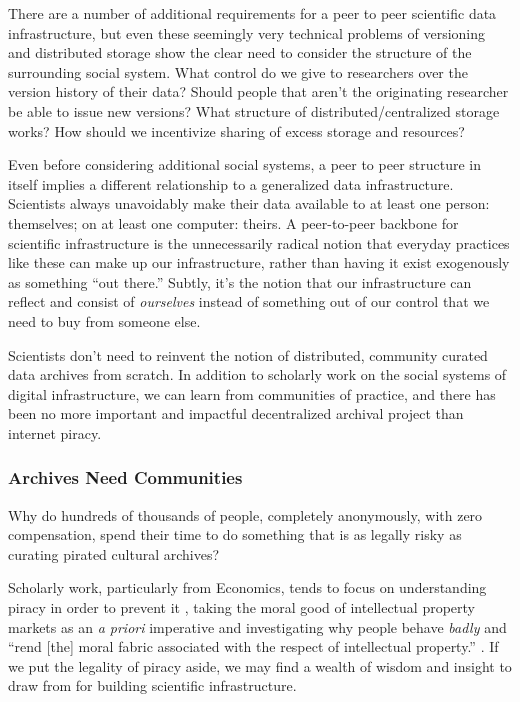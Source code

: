 \documentclass[10pt]{article}
\begin{document}
\begin{multicols}{2}
There are a number of additional requirements for a peer to peer
scientific data infrastructure, but even these seemingly very technical
problems of versioning and distributed storage show the clear need to
consider the structure of the surrounding social system. What control do
we give to researchers over the version history of their data? Should
people that aren't the originating researcher be able to issue new
versions? What structure of distributed/centralized storage works? How
should we incentivize sharing of excess storage and resources?

Even before considering additional social systems, a peer to peer
structure in itself implies a different relationship to a generalized
data infrastructure. Scientists always unavoidably make their data
available to at least one person: themselves; on at least one computer:
theirs. A peer-to-peer backbone for scientific infrastructure is the
unnecessarily radical notion that everyday practices like these can make
up our infrastructure, rather than having it exist exogenously as
something ``out there.'' Subtly, it's the notion that our infrastructure
can reflect and consist of \emph{ourselves} instead of something out of
our control that we need to buy from someone else.

Scientists don't need to reinvent the notion of distributed, community
curated data archives from scratch. In addition to scholarly work on the
social systems of digital infrastructure, we can learn from communities
of practice, and there has been no more important and impactful
decentralized archival project than internet piracy.

\hypertarget{archives-need-communities}{%
\subsubsection{Archives Need
Communities}\label{archives-need-communities}}

Why do hundreds of thousands of people, completely anonymously, with
zero compensation, spend their time to do something that is as legally
risky as curating pirated cultural archives?

Scholarly work, particularly from Economics, tends to focus on
understanding piracy in order to prevent it\cite{basamanowiczReleaseGroupsDigital2011, hindujaDeindividuationInternetSoftware2008} , taking the moral good
of intellectual property markets as an \emph{a priori} imperative and
investigating why people behave \emph{badly} and ``rend {[}the{]} moral
fabric associated with the respect of intellectual property.'' \cite{hindujaDeindividuationInternetSoftware2008} . If we put the legality
of piracy aside, we may find a wealth of wisdom and insight to draw from
for building scientific infrastructure.


\end{multicols}
\end{document}
